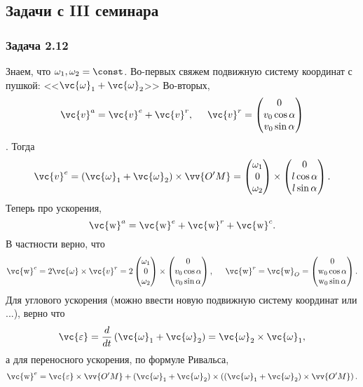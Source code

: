 \subsection{Задачи с III семинара}
\subsubsection*{Задача 2.12}
Знаем, что $\omega_1, \omega_2 = \const$.
Во-первых свяжем подвижную систему координат с пушкой: <<$\vc{\omega}_1 + \vc{\omega}_2$>>
Во-вторых,
$$
    \vc{v}^a = \vc{v}^e + \vc{v}^r,
    \hspace{0.5cm} 
    \vc{v}^r = \begin{pmatrix}
        0 \\ v_0 \cos \alpha \\ v_0 \sin \alpha
    \end{pmatrix}
$$. 
Тогда
$$
    \vc{v}^e = (\vc{\omega}_1 + \vc{\omega}_2) \times \vv{O'M} = \begin{pmatrix}
        \omega_1 \\ 0 \\ \omega_2
    \end{pmatrix} \times
    \begin{pmatrix}
        0 \\ l \cos \alpha \\ l \sin \alpha
    \end{pmatrix}.
$$
Теперь про ускорения, 
$$
    \vc{\mathrm{w}}^a = \vc{\mathrm{w}}^e + \vc{\mathrm{w}}^r + \vc{\mathrm{w}}^c.
$$
В частности верно, что
$$
    \vc{\mathrm{w}}^c = 2 \vc{\omega} \times \vc{v}^r = 2 \begin{pmatrix}
        \omega_1 \\ 0 \\ \omega_2
    \end{pmatrix} \times
    \begin{pmatrix}
        0 \\ v_0 \cos \alpha \\ v_0 \sin \alpha
    \end{pmatrix},
    \hspace{0.5cm} 
    \vc{\mathrm{w}}^r = \vc{\mathrm{w}}_O = \begin{pmatrix}
        0 \\ \mathrm{w}_0 \cos \alpha \\ \mathrm{w}_0 \sin \alpha
    \end{pmatrix}.
$$
Для углового ускорения (можно ввести новую подвижную систему координат или ...), верно что
$$
    \vc{\varepsilon} = 
    \frac{d}{dt} \left(\vc{\omega}_1 + \vc{\omega}_2 \right) = \vc{\omega}_2 \times \vc{\omega}_1,
$$
а для переносного ускорения, по формуле Ривальса, 
$$
    \vc{\mathrm{w}}^e = \vc{\varepsilon} \times \vv{O'M} + (\vc{\omega}_1 + \vc{\omega}_2) \times \left(
        (\vc{\omega}_1 + \vc{\omega}_2) \times \vv{O'M}
    \right).
$$

